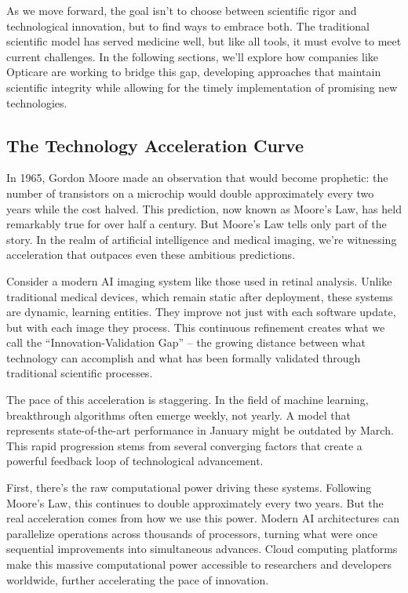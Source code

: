 \documentclass[
  Letterpaper,
]{scrbook}
\begin{document}
As we move forward, the goal isn't to choose between scientific rigor
and technological innovation, but to find ways to embrace both. The
traditional scientific model has served medicine well, but like all
tools, it must evolve to meet current challenges. In the following
sections, we'll explore how companies like Opticare are working to
bridge this gap, developing approaches that maintain scientific
integrity while allowing for the timely implementation of promising new
technologies.

\subsection{The Technology Acceleration
Curve}\label{the-technology-acceleration-curve}

In 1965, Gordon Moore made an observation that would become prophetic:
the number of transistors on a microchip would double approximately
every two years while the cost halved. This prediction, now known as
Moore's Law, has held remarkably true for over half a century. But
Moore's Law tells only part of the story. In the realm of artificial
intelligence and medical imaging, we're witnessing acceleration that
outpaces even these ambitious predictions.

Consider a modern AI imaging system like those used in retinal analysis.
Unlike traditional medical devices, which remain static after
deployment, these systems are dynamic, learning entities. They improve
not just with each software update, but with each image they process.
This continuous refinement creates what we call the
``Innovation-Validation Gap'' -- the growing distance between what
technology can accomplish and what has been formally validated through
traditional scientific processes.

The pace of this acceleration is staggering. In the field of machine
learning, breakthrough algorithms often emerge weekly, not yearly. A
model that represents state-of-the-art performance in January might be
outdated by March. This rapid progression stems from several converging
factors that create a powerful feedback loop of technological
advancement.

First, there's the raw computational power driving these systems.
Following Moore's Law, this continues to double approximately every two
years. But the real acceleration comes from how we use this power.
Modern AI architectures can parallelize operations across thousands of
processors, turning what were once sequential improvements into
simultaneous advances. Cloud computing platforms make this massive
computational power accessible to researchers and developers worldwide,
further accelerating the pace of innovation.
\end{document}
